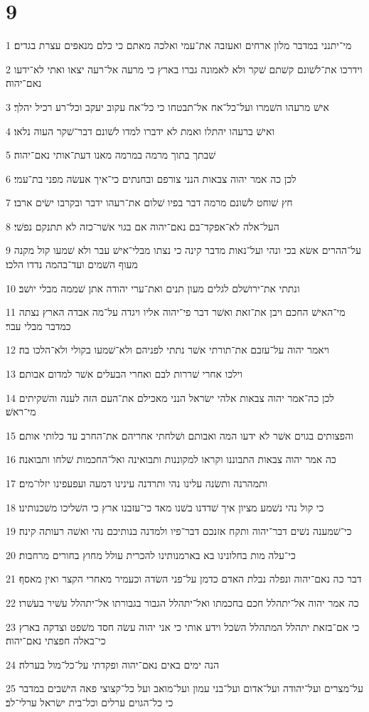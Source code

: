 \chapter{9}

\par 1 מי־יתנני במדבר מלון ארחים ואעזבה את־עמי ואלכה מאתם כי כלם מנאפים עצרת בגדים׃
\par 2 וידרכו את־לשׁונם קשׁתם שׁקר ולא לאמונה גברו בארץ כי מרעה אל־רעה יצאו ואתי לא־ידעו נאם־יהוה׃
\par 3 אישׁ מרעהו השׁמרו ועל־כל־אח אל־תבטחו כי כל־אח עקוב יעקב וכל־רע רכיל יהלך׃
\par 4 ואישׁ ברעהו יהתלו ואמת לא ידברו למדו לשׁונם דבר־שׁקר העוה נלאו׃
\par 5 שׁבתך בתוך מרמה במרמה מאנו דעת־אותי נאם־יהוה׃
\par 6 לכן כה אמר יהוה צבאות הנני צורפם ובחנתים כי־איך אעשׂה מפני בת־עמי׃
\par 7 חץ שׁוחט לשׁונם מרמה דבר בפיו שׁלום את־רעהו ידבר ובקרבו ישׂים ארבו׃
\par 8 העל־אלה לא־אפקד־בם נאם־יהוה אם בגוי אשׁר־כזה לא תתנקם נפשׁי׃
\par 9 על־ההרים אשׂא בכי ונהי ועל־נאות מדבר קינה כי נצתו מבלי־אישׁ עבר ולא שׁמעו קול מקנה מעוף השׁמים ועד־בהמה נדדו הלכו׃
\par 10 ונתתי את־ירושׁלם לגלים מעון תנים ואת־ערי יהודה אתן שׁממה מבלי יושׁב׃
\par 11 מי־האישׁ החכם ויבן את־זאת ואשׁר דבר פי־יהוה אליו ויגדה על־מה אבדה הארץ נצתה כמדבר מבלי עבר׃
\par 12 ויאמר יהוה על־עזבם את־תורתי אשׁר נתתי לפניהם ולא־שׁמעו בקולי ולא־הלכו בה׃
\par 13 וילכו אחרי שׁררות לבם ואחרי הבעלים אשׁר למדום אבותם׃
\par 14 לכן כה־אמר יהוה צבאות אלהי ישׂראל הנני מאכילם את־העם הזה לענה והשׁקיתים מי־ראשׁ׃
\par 15 והפצותים בגוים אשׁר לא ידעו המה ואבותם ושׁלחתי אחריהם את־החרב עד כלותי אותם׃
\par 16 כה אמר יהוה צבאות התבוננו וקראו למקוננות ותבואינה ואל־החכמות שׁלחו ותבואנה׃
\par 17 ותמהרנה ותשׂנה עלינו נהי ותרדנה עינינו דמעה ועפעפינו יזלו־מים׃
\par 18 כי קול נהי נשׁמע מציון איך שׁדדנו בשׁנו מאד כי־עזבנו ארץ כי השׁליכו משׁכנותינו׃
\par 19 כי־שׁמענה נשׁים דבר־יהוה ותקח אזנכם דבר־פיו ולמדנה בנותיכם נהי ואשׁה רעותה קינה׃
\par 20 כי־עלה מות בחלונינו בא בארמנותינו להכרית עולל מחוץ בחורים מרחבות׃
\par 21 דבר כה נאם־יהוה ונפלה נבלת האדם כדמן על־פני השׂדה וכעמיר מאחרי הקצר ואין מאסף׃
\par 22 כה אמר יהוה אל־יתהלל חכם בחכמתו ואל־יתהלל הגבור בגבורתו אל־יתהלל עשׁיר בעשׁרו׃
\par 23 כי אם־בזאת יתהלל המתהלל השׂכל וידע אותי כי אני יהוה עשׂה חסד משׁפט וצדקה בארץ כי־באלה חפצתי נאם־יהוה׃
\par 24 הנה ימים באים נאם־יהוה ופקדתי על־כל־מול בערלה׃
\par 25 על־מצרים ועל־יהודה ועל־אדום ועל־בני עמון ועל־מואב ועל כל־קצוצי פאה הישׁבים במדבר כי כל־הגוים ערלים וכל־בית ישׂראל ערלי־לב׃

